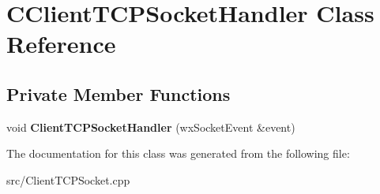 \section{CClientTCPSocketHandler Class Reference}
\label{classCClientTCPSocketHandler}
\subsection*{Private Member Functions}
\begin{DoxyCompactItemize}
\item 
void {\bfseries ClientTCPSocketHandler} (wxSocketEvent \&event)\label{classCClientTCPSocketHandler_a15fdd8ae581e33536cb221eb1ed7de17}

\end{DoxyCompactItemize}


The documentation for this class was generated from the following file:\begin{DoxyCompactItemize}
\item 
src/ClientTCPSocket.cpp\end{DoxyCompactItemize}
